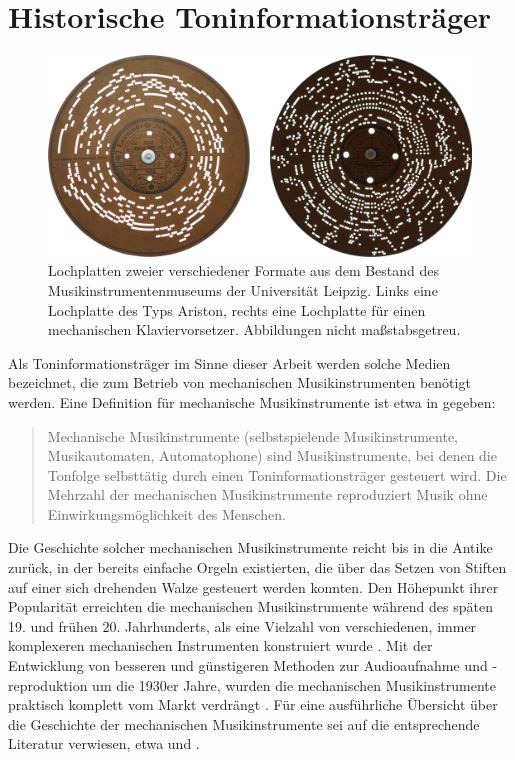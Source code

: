 \FloatBarrier
\section{Historische Toninformationsträger}

\begin{figure}[t]
    \centering
    \includegraphics[width=\textwidth]{graphics/cardboard_plates.png}
    \caption{Lochplatten zweier verschiedener Formate aus dem Bestand des Musikinstrumentenmuseums der Universität Leipzig. Links eine Lochplatte des Typs Ariston, rechts eine Lochplatte für einen mechanischen Klaviervorsetzer. Abbildungen nicht maßstabsgetreu.}
    \label{platten}
\end{figure}

Als Toninformationsträger im Sinne dieser Arbeit werden solche Medien bezeichnet, die zum Betrieb von mechanischen Musikinstrumenten benötigt werden.
Eine Definition für mechanische Musikinstrumente ist etwa in \textcite[]{mgg_mechanische} gegeben:

\begin{quotation}
    Mechanische Musikinstrumente (selbstspielende Musikinstrumente, Musikautomaten, Automatophone) sind Musikinstrumente, bei denen die Tonfolge selbsttätig durch einen Toninformationsträger gesteuert wird. Die Mehrzahl der mechanischen Musikinstrumente reproduziert Musik ohne Einwirkungsmöglichkeit des Menschen. \parencite[I. Definition]{mgg_mechanische}
\end{quotation}

Die Geschichte solcher mechanischen Musikinstrumente reicht bis in die Antike zurück, in der bereits einfache Orgeln existierten, die über das Setzen von Stiften auf einer sich drehenden Walze gesteuert werden konnten.
Den Höhepunkt ihrer Popularität erreichten die mechanischen Musikinstrumente während des späten 19. und frühen 20. Jahrhunderts, als eine Vielzahl von verschiedenen, immer komplexeren mechanischen Instrumenten konstruiert wurde \parencite[10-12]{bowers_1972}.
Mit der Entwicklung von besseren und günstigeren Methoden zur Audioaufnahme und -reproduktion um die 1930er Jahre, wurden die mechanischen Musikinstrumente praktisch komplett vom Markt verdrängt \parencite[2]{zoltan_1994}.
Für eine ausführliche Übersicht über die Geschichte der mechanischen Musikinstrumente sei auf die entsprechende Literatur verwiesen, etwa \textcite[]{bowers_1972,bowers_1975} und \textcite[]{mgg_mechanische}.

